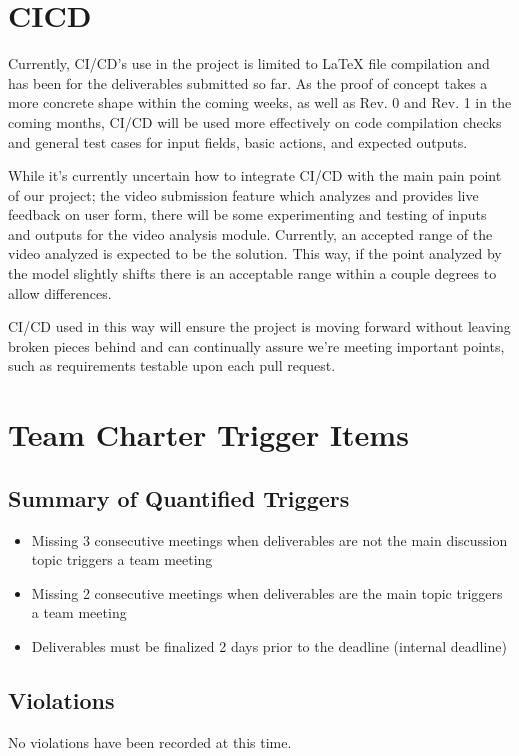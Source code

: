\documentclass{article}
\begin{document}
\section{CICD}

Currently, CI/CD’s use in the project is limited to LaTeX file compilation and has been for the deliverables submitted so far. As the proof of concept takes a more concrete shape within the coming weeks, as well as Rev. 0 and Rev. 1 in the coming months, CI/CD will be used more effectively on code compilation checks and general test cases for input fields, basic actions, and expected outputs.

While it’s currently uncertain how to integrate CI/CD with the main pain point of our project; the video submission feature which analyzes and provides live feedback on user form, there will be some experimenting and testing of inputs and outputs for the video analysis module. Currently, an accepted range of the video analyzed is expected to be the solution. This way, if the point analyzed by the model slightly shifts there is an acceptable range within a couple degrees to allow differences.

CI/CD used in this way will ensure the project is moving forward without leaving broken pieces behind and can continually assure we’re meeting important points, such as requirements testable upon each pull request.

\section{Team Charter Trigger Items}

\subsection{Summary of Quantified Triggers}
\begin{itemize}
    \item Missing 3 consecutive meetings when deliverables are not the main discussion topic triggers a team meeting
    \item Missing 2 consecutive meetings when deliverables are the main topic triggers a team meeting
    \item Deliverables must be finalized 2 days prior to the deadline (internal deadline)
\end{itemize}
 
\subsection{Violations}
No violations have been recorded at this time.
 
\end{document}

